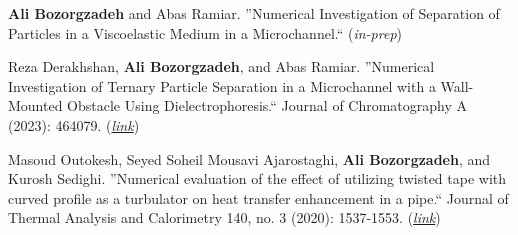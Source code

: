 %
%
%



\begin{scholarship}

{
  \textbf{Ali Bozorgzadeh} and Abas Ramiar. ''Numerical Investigation of
  Separation of Particles in a Viscoelastic Medium in a Microchannel.``
  (\emph{in-prep})
}

{
  Reza Derakhshan, \textbf{Ali Bozorgzadeh}, and Abas Ramiar. ''Numerical Investigation
  of Ternary Particle Separation in a Microchannel with a Wall-Mounted
  Obstacle Using Dielectrophoresis.`` Journal of Chromatography A (2023):
  464079.
  (\href{https://www.sciencedirect.com/science/article/pii/S0021967323003059}{\emph{link}})
}

  {
  Masoud Outokesh, Seyed Soheil Mousavi Ajarostaghi, \textbf{Ali Bozorgzadeh},
  and Kurosh Sedighi. ''Numerical evaluation of the effect of utilizing twisted
  tape with curved profile as a turbulator on heat transfer enhancement in a
  pipe.`` Journal of Thermal Analysis and Calorimetry 140, no. 3 (2020):
  1537-1553.
  (\href{https://link.springer.com/article/10.1007/s10973-020-09336-0}{\emph{link}})
}
\end{scholarship}
